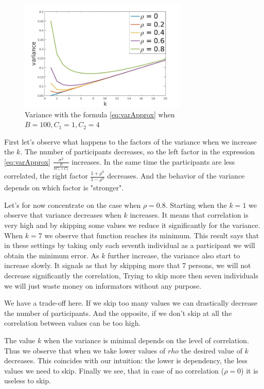 \documentclass[12pt]{report}
\begin{document}
\begin{figure}[ht]
    \centering
    \includegraphics[height=200px]{varPredDifRho}
    \caption{Variance with the formula \ref{eq:varApprox} when $B = 100, C_1 = 1, C_2 = 4$}
    \label{fig:varPredDifRho}
\end{figure}

First let's observe what happens to the factors of the variance when we increase the $k$. The number of participants decreases, so the left factor in the expression \ref{eq:varApprox} $\frac{\sigma^2}{\frac{B}{kC_1 + C_2}}$ increases. In the same time the participants are less correlated, the right factor  $\frac{1+\rho^k}{1-\rho^k}$ decreases. And the behavior of the variance depends on which factor is "stronger".

Let's for now concentrate on the case when $\rho = 0.8$. Starting when the $k = 1$ we observe that variance decreases when $k$ increases. It means that correlation is very high and by skipping some values we reduce it significantly for the variance. When $k = 7$ we observe that function reaches its minimum. This result says that in these settings by taking only each seventh individual as a participant we will obtain the minimum error.  As $k$ further increase, the variance also start to increase slowly. It signals as that by skipping more that 7 persons, we will not decrease significantly the correlation, Trying to skip more then seven individuals we will just waste money on informators without any purpose.

We have a trade-off here. If we skip too many values we can drastically decrease the number of participants. And the opposite, if we don't skip at all the correlation between values can be too high. 

The value $k$ when the variance is minimal depends on the level of correlation. Thus we observe that when we take lower values of $rho$ the desired value of $k$ decreases. This coincides with our intuition: the lower is dependency, the less values we need to skip. Finally we see, that in case of no correlation ($\rho = 0$) it is useless to skip.
 
\end{document}
